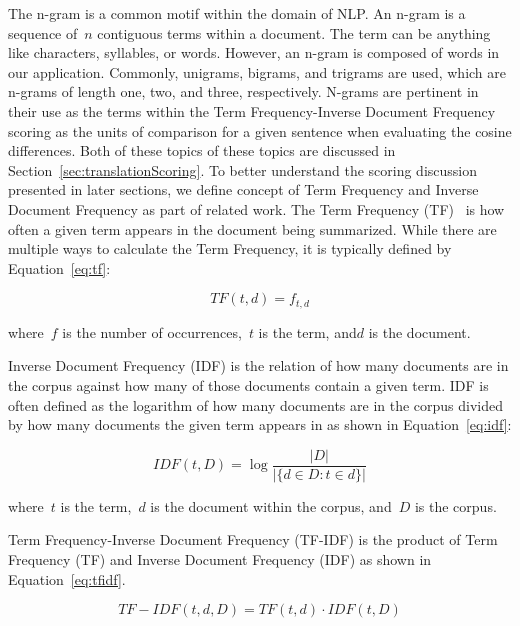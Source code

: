 \documentclass{article}[10]
\begin{document}
The n-gram is a common motif within the domain of NLP\@. An n-gram is a sequence of~\(n\) contiguous terms within a document. The term can be anything like characters, syllables, or words. However, an n-gram is composed of words in our application. Commonly, unigrams, bigrams, and trigrams are used, which are n-grams of length one, two, and three, respectively. N-grams are pertinent in their use as the terms within the Term Frequency-Inverse Document Frequency scoring as the units of comparison for a given sentence when evaluating the cosine differences. Both of these topics of these topics are discussed in Section~\ref{sec:translationScoring}. To better understand the scoring discussion presented in later sections, we define concept of Term Frequency and Inverse Document Frequency as part of related work. The Term Frequency (TF)~\cite{Leskovec} is how often a given term appears in the document being summarized. While there are multiple ways to calculate the Term Frequency, it is typically defined by Equation~\eqref{eq:tf}:

\begin{equation}
  TF(t, d) = f_{t, d} \label{eq:tf}
\end{equation}

where~\(f\) is the number of occurrences,~\(t\) is the term, and\(d\) is the document.

Inverse Document Frequency (IDF) is the relation of how many documents are in the corpus against how many of those documents contain a given term. IDF is often defined as the logarithm of how many documents are in the corpus divided by how many documents the given term appears in as shown in Equation~\eqref{eq:idf}:

\begin{equation}
  IDF(t, D) = \log\frac{|D|}{|\{d \in D : t \in d\}|} \label{eq:idf}
\end{equation}

where~\(t\) is the term,~\(d\) is the document within the corpus, and~\(D\) is the corpus.

Term Frequency-Inverse Document Frequency (TF-IDF) is the product of Term Frequency (TF) and Inverse Document Frequency (IDF) as shown in Equation~\eqref{eq:tfidf}.

\begin{equation}
  TF-IDF(t, d, D) = TF(t, d) \cdot IDF(t, D) \label{eq:tfidf}
\end{equation}
\end{document}

